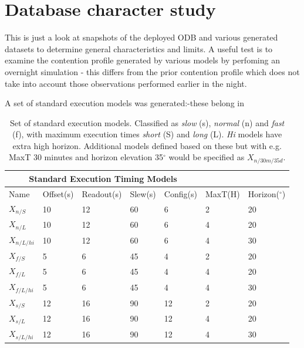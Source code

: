 \section{Database character study}
\label{sect:db_character_study}
This is just a look at snapshots of the deployed ODB and various generated datasets to determine general characteristics and limits. A useful test is to examine the contention profile generated by various models by perfoming an overnight simulation - this differs from the prior contention profile which does not take into account those observations performed earlier in the night.

A set of standard execution models was generated:-these belong in 

\begin{table}[h]
\begin{center}
\begin{tabular}{lllllll}
\toprule
\multicolumn{5}{c}{Standard Execution Timing Models} \\
\midrule
Name & Offset(s) & Readout(s) & Slew(s) & Config(s) & MaxT(H) & Horizon($^{\circ}$) \\
\midrule
$X_{n/S}$      & 10     & 12      & 60   & 6  &  2  & 20 \\
$X_{n/L}$      & 10     & 12      & 60   & 6  &  4  & 20 \\
$X_{n/L/hi}$   & 10     & 12      & 60   & 6  &  4  & 30 \\
$X_{f/S}$      & 5      & 6       & 45   & 4  &  2  & 20 \\
$X_{f/L}$      & 5      & 6       & 45   & 4  &  4  & 20 \\
$X_{f/L/hi}$   & 5      & 6       & 45   & 4  &  4  & 30 \\
$X_{s/S}$      & 12     & 16      & 90   & 12 &  2  & 20 \\ 
$X_{s/L}$      & 12     & 16      & 90   & 12 &  4  & 20 \\ 
$X_{s/L/hi}$   & 12     & 16      & 90   & 12 &  4  & 30 \\ 
\bottomrule
\end{tabular}
\end{center}
\caption{Set of standard execution models. Classified as \emph{slow} (s), \emph{normal} (n) and \emph{fast} (f), with maximum execution times \emph{short} (S) and \emph{long} (L). \emph{Hi} models have extra high horizon. Additional models defined based on these but with e.g. MaxT 30 minutes and horizon elevation 35$^{\circ}$ would be specified as $X_{n/30m/35d}$. }
\end{table}

